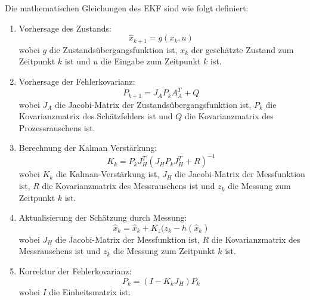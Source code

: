 Die mathematischen Gleichungen des EKF sind wie folgt definiert:
\begin{enumerate}
      \item Vorhersage des Zustands:
            \begin{equation*}
                  \hat{x}_{k+1} = g({x}_{k}, u)\
            \end{equation*}
            wobei $g$ die Zustandsübergangsfunktion ist,
            $x_{k}$ der geschätzte Zustand zum Zeitpunkt $k$ ist
            und $u$ die Eingabe zum Zeitpunkt $k$ ist.\\
      \item Vorhersage der Fehlerkovarianz:
            \begin{equation*}
                  P_{k + 1} = J_{A} P_{k} A_{A}^T + Q\
            \end{equation*}
            wobei $J_{A}$ die Jacobi-Matrix der Zustandsübergangsfunktion ist,
            $P_{k}$ die Kovarianzmatrix des Schätzfehlers ist
            und $Q$ die Kovarianzmatrix des Prozessrauschens ist.\\
      \item Berechnung der Kalman Verstärkung:
            \begin{equation*}
                  K_{k} = P_{k} J_{H}^T (J_{H} P_{k} J_{H}^T + R)^{-1}\
            \end{equation*}
            wobei $K_{k} $ die Kalman-Verstärkung ist,
            $J_{H}$ die Jacobi-Matrix der Messfunktion ist,
            $R$ die Kovarianzmatrix des Messrauschens ist und
            $z_{k}$ die Messung zum Zeitpunkt $k$ ist.\\
      \item Aktualisierung der Schätzung durch Messung:
            \begin{equation*}
                  \hat{x}_{k} = \hat{x}_{k} + K_{z} (z_{k} - h (\hat{x}_{k})\
            \end{equation*}
            wobei $J_{H}$ die Jacobi-Matrix der Messfunktion ist,
            $R$ die Kovarianzmatrix des Messrauschens ist
            und $z_{k}$ die Messung zum Zeitpunkt $k$ ist.\\

      \item Korrektur der Fehlerkovarianz:
            \begin{equation*}
                  P_{k} = (I - K_{k} J_{H}) P_{k}\
            \end{equation*}
            wobei $I$ die Einheitsmatrix ist.\\
\end{enumerate}

